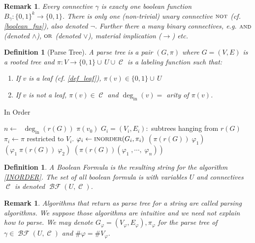 \documentclass[12pt]{article}
\let\aand\wedge
\let\oor\vee
\newcommand{\scr}[1]{{\scriptstyle\textup{#1}}}
\newcommand{\scrf}[1]{{\scriptstyle\textup{\footnotesize #1}}}
\DeclareMathOperator{\C}{\mathcal{C}}
\DeclareMathOperator{\BF}{\mathcal{BF}}
\DeclareMathOperator{\NOT}{\scr{NOT}}
\DeclareMathOperator{\OR}{\scr{OR}}
\DeclareMathOperator{\AND}{\scr{AND}}
\newcommand*{\B}{\{0,1\}}
\newcommand*{\degin}{\deg_{\text{in}}}
\newtheorem{definition}[theorem]{Definition}
\newtheorem{remark}[theorem]{Remark}
\begin{document}
\begin{remark}
  Every connective $\gamma$ is exacty one boolean function $B_\gamma:\B^k\to\B$. There is only one (non-trivial) unary connective $\NOT$ (cf. \ref{boolean_fns}), also denoted $\neg$. Further there a many binary connectives, e.g. $\AND$ (denoted $\aand$), $\OR$ (denoted $\oor$), material implication ($\to$) etc.
\end{remark}

\begin{definition}[Parse Tree]
  \label{parse_tree}
  A parse tree is a pair $(G,\pi)$ where $G=(V,E)$ is a rooted tree and $\pi:V\to\B\cup\,U\cup\C$ is a labeling function such that:
  \begin{enumerate}
    \item If $v$ is a leaf (cf. \ref{def_leaf}), $\pi(v)\in\B\cup\,U$
    \item If $v$ is not a leaf, $\pi(v)\in\C$ and $\degin(v)=$ arity of $\pi(v)$.
  \end{enumerate}
\end{definition}

\begin{algorithm}[H]
  \caption{In Order}
  \begin{algorithmic}
    \Function{$\scrf{INORDER}$}{$G=(V,E),\pi$}
      \State $n\gets\;$ $\degin(r(G))$
        \State\Return $\pi(v_0)$
      \Else
        \State $G_i=(V_i,E_i):$ subtrees hanging from $r(G)$
        \State $\pi_i\gets \pi$ restricted to $V_i$.
        \State $\varphi_i\gets \scrf{INORDER}(G_i,\pi_i)$
          \Return $(\pi(r(G))\;\varphi_1)$
         \Return $(\varphi_1\;\pi(r(G))\;\varphi_2)$
        \Else{} \Return $(\pi(r(G)) (\varphi_1\;,\cdots,\;\varphi_n))$
        \EndIf
      \EndIf
    \EndFunction
  \end{algorithmic}
  \label{INORDER}
\end{algorithm}

\begin{definition}
  \label{def_formula_tree}
  A Boolean Formula is the resulting string for the algorithm \ref{INORDER}. The set of all boolean formula is with variables $U$ and connectives $\C$ is denoted $\BF(U,\C)$.
\end{definition}

\begin{remark}
  \label{parsing}
  Algorithms that return as parse tree for a string are called parsing algorithms. We suppose those algorithms are intuitive and we need not explain how to parse. We may denote $G_\varphi=(V_\varphi,E_\varphi),\pi_\varphi$ for the parse tree of $\gamma\in\BF(U,\C)$ and $\#\varphi=\#V_\varphi$.
\end{remark}
\end{document}
